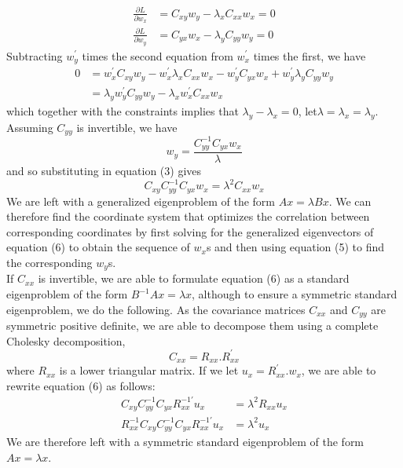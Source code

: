 \documentclass[fleqn,a4paper,11pt]{article}
\begin{document}
\begin{align}
\frac{\partial L}{\partial w_x} &= C_{xy}w_y - \lambda_x C_{xx}w_x = 0 \\
\frac{\partial L}{\partial w_y} &= C_{yx}w_x - \lambda_y C_{yy}w_y = 0
\end{align}
\noindent Subtracting $w_y^{'}$ times the second equation from $w_x^{'}$ times the first, we have
\begin{align*}
0 &= w_x^{'}C_{xy}w_y - w_x^{'}\lambda_x C_{xx}w_x - w_y^{'}C_{yx}w_x 	+ w_y^{'}\lambda_y C_{yy}w_y \\
&= \lambda_y w_y^{'} C_{yy} w_y - \lambda_x w_x^{'} C_{xx} w_x 
\end{align*}
\noindent which together with the constraints implies that $\lambda_y−\lambda_x = 0$, let$ \lambda = \lambda_x = \lambda_y$.
Assuming $C_{yy}$ is invertible, we have
\begin{equation}
 w_y = \frac{C_{yy}^{-1}C_{yx}w_x}{\lambda}
\end{equation}
and so substituting in equation (3) gives
\begin{equation}
C_{xy}C_{yy}^{-1}C_{yx}w_x = \lambda^{2} C_{xx} w_x
\end{equation}
We are left with a generalized eigenproblem of the form $Ax = \lambda Bx$. We can therefore find the coordinate system that optimizes the correlation between corresponding coordinates by first solving for the generalized eigenvectors of equation (6) to obtain the sequence of $w_x$s and then using equation (5) to find the corresponding $w_y$s. \\
\indent If $C_{xx}$ is invertible, we are able to formulate equation (6) as a standard eigenproblem of the form $B^{-1} Ax = \lambda x$, although to ensure a symmetric standard eigenproblem, we do the following. As the covariance matrices $C_{xx}$ and $C_{yy}$ are symmetric positive definite, we are able to decompose them
using a complete Cholesky decomposition,
\begin{equation*}
C_{xx}  = R_{xx}.R_{xx}^{'}
\end{equation*}
where $R_{xx}$ is a lower triangular matrix. If we let $u_x = R_{xx}^{'}.w_x$, we are able
to rewrite equation (6) as follows:
\begin{align*}
C_{xy}C_{yy}^{-1}C_{yx} R_{xx}^{-1'} u_x &= \lambda^{2} R_{xx} u_x \\
R_{xx}^{-1} C_{xy}C_{yy}^{-1}C_{yx} R_{xx}^{-1'} u_x &= \lambda^{2}  u_x
\end{align*}
We are therefore left with a symmetric standard eigenproblem of the form
$Ax = \lambda x$.
\end{document}
